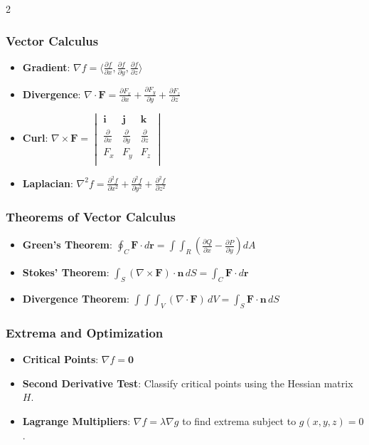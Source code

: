 \begin{multicols}{2}
\subsubsection*{Vector Calculus}
\begin{itemize}
\item \textbf{Gradient}: $\nabla f = \langle \frac{\partial f}{\partial x}, \frac{\partial f}{\partial y}, \frac{\partial f}{\partial z} \rangle$
\item \textbf{Divergence}: $\nabla \cdot \mathbf{F} = \frac{\partial F_x}{\partial x} + \frac{\partial F_y}{\partial y} + \frac{\partial F_z}{\partial z}$
\item \textbf{Curl}: $\nabla \times \mathbf{F} = \begin{vmatrix}
\mathbf{i} & \mathbf{j} & \mathbf{k} \\
\frac{\partial}{\partial x} & \frac{\partial}{\partial y} & \frac{\partial}{\partial z} \\
F_x & F_y & F_z \\
\end{vmatrix}$
\item \textbf{Laplacian}: $\nabla^2 f = \frac{\partial^2 f}{\partial x^2} + \frac{\partial^2 f}{\partial y^2} + \frac{\partial^2 f}{\partial z^2}$
\end{itemize}

\subsubsection*{Theorems of Vector Calculus}
\begin{itemize}
\item \textbf{Green's Theorem}: $\oint_C \mathbf{F} \cdot d\mathbf{r} = \int\!\!\!\int_R \left( \frac{\partial Q}{\partial x} - \frac{\partial P}{\partial y} \right) dA$
\item \textbf{Stokes' Theorem}: $\int_S (\nabla \times \mathbf{F}) \cdot \mathbf{n} \, dS = \int_C \mathbf{F} \cdot d\mathbf{r}$
\item \textbf{Divergence Theorem}: $\int\!\!\!\int\!\!\!\int_V (\nabla \cdot \mathbf{F}) \, dV = \int_S \mathbf{F} \cdot \mathbf{n} \, dS$
\end{itemize}

\subsubsection*{Extrema and Optimization}
\begin{itemize}
\item \textbf{Critical Points}: $\nabla f = \mathbf{0}$
\item \textbf{Second Derivative Test}: Classify critical points using the Hessian matrix $H$.
\item \textbf{Lagrange Multipliers}: $\nabla f = \lambda \nabla g$ to find extrema subject to $g(x, y, z) = 0$.
\end{itemize}

\end{multicols}


